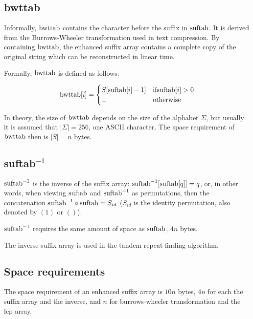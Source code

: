 \documentclass[a4paper,10pt]{article}
\begin{document}
\subsection*{bwttab}

Informally, $\hbox{bwttab}$ contains the character before the suffix in
$\hbox{suftab}$. It is derived from the Burrows-Wheeler transformation
used in text compression.
By containing $\hbox{bwttab}$, the enhanced suffix array contains a
complete copy of the original string which can be reconstructed in
linear time.

Formally, $\hbox{bwttab}$ is defined as follows:

\begin{equation}
	\hbox{bwttab}[i]=
	\begin{cases}
		S[\hbox{suftab}[i]-1] & \text{if} \hbox{suftab}[i]>0 \\
		\bot & \text{otherwise}
	\end{cases}
\end{equation}

In theory, the size of $\hbox{bwttab}$ depends on the size of the alphabet
$\Sigma$, but usually it is assumed that $|\Sigma|=256$, one ASCII
character. The space requirement of $\hbox{bwttab}$ then is $|S|=n$ bytes.

\subsection*{suftab$^{-1}$}

$\hbox{suftab}^{-1}$ is the inverse of the suffix array:
$\hbox{suftab}^{-1}[\hbox{suftab}[q]]=q$, or, in other words, when
viewing $\hbox{suftab}$ and $\hbox{suftab}^{-1}$ as permutations,
then the concatenation $\hbox{suftab}^{-1} \circ \hbox{suftab}=S_{id}$
($S_{id}$ is the identity permutation, also denoted by $(1)$ or $()$).

$\hbox{suftab}^{-1}$ requires the same amount of space as $\hbox{suftab}$,
$4n$ bytes.

The inverse suffix array is used in the tandem repeat finding algorithm.

\subsection*{Space requirements}

The space requirement of an enhanced suffix array is $10n$ bytes, $4n$
for each the suffix array and the inverse, and $n$ for burrows-wheeler
transformation and the lcp array.
\end{document}
